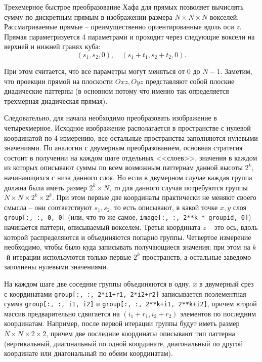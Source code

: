 
Трехемерное быстрое преобразование Хафа для прямых позволяет вычислять сумму по дискретным прямым в изображении размера $N \times N \times N$ вокселей. Рассматриваемые прямые -- преимущественно ориентированные вдоль оси $z$. Прямая параметризуется 4 параметрами и проходит через следующие воксели на верхней и нижней гранях куба:
\begin{equation*}
    (s_1, s_2, 0), \quad
    (s_1 + t_1, s_2 + t_2, 0).
\end{equation*}

При этом считается, что все параметры могут меняться от $0$ до $N-1$. Заметим, что проекции прямой на плоскости $Oxz, Oyz$ представляют собой плоские диадические паттерны (в основном потому что именно так определяется трехмерная диадическая прямая).

Следовательно, для начала необходимо преобразовать изображение в четырехмерное. Исходное изображение располагается в пространстве с нулевой координатой по 4 измерению, все остальные пространства заполняются нулевыми значениями.
По аналогии с двумерным преобразованием, основная стратегия состоит в получении на каждом шаге отдельных <<слоев>>, значения в каждом из которых описывают суммы по всем возможным паттернам данной высоты $2^k$, начинающихся с низа данного слоя.
Но если в двумерном случае каждая группа должна была иметь размер $2^k \times N$, то для данного случая потребуются группы $N \times N \times 2^k \times 2^k$.
При этом первые две координаты практически не меняют своего смысла -- они соответствуют $s_1, s_2$, то есть описывают, в какой точке $x, y$ слоя \texttt{group[:, :, 0, 0]} (или, что то же самое, \texttt{image[:, :, 2**k * groupid, 0]}) начинается паттерн, описываемый вокселем. Третья координата $z$ -- это ось, вдоль которой распределяются и объединяются попарно группы. Четвертое измерение необходимо, чтобы было куда записывать получающиеся значения; при этом на $k$-й итерации используются только первые $2^k$ пространств, а остальные заведомо заполнены нулевыми значениями.

На каждом шаге две соседние группы объединяются в одну, и в двумерный срез с координатами \texttt{group[:, :, 2*i1+r1, 2*i2+r2]} записывается поэлементная сумма \texttt{group[:, :, i1, i2]} и \texttt{group[:, :, 2**k+i1, 2**k+i2]}, причем второй массив предварительно сдвигается на $(i_1+r_1, i_2+r_2)$ элементов по последним координатам. Например, после первой итерации группы будут иметь размер $N \times N \times 2 \times 2$, причем две последние координаты описывают тип паттерна (вертикальный, диагональный по одной координате, диагональный по другой координате или диагональный по обеим координатам).

